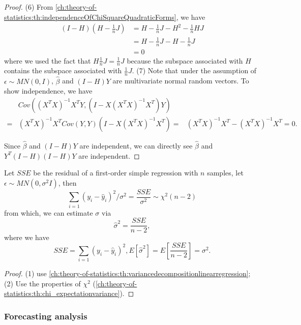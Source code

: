 \begin{refsection}
\begin{proof}
	(6) From \autoref{ch:theory-of-statistics:th:independenceOfChiSquareQuadraticForms}, we have
	\begin{align*}
	(I-H)(H-\frac{1}{n}J) &= H - \frac{1}{n}J - H^2 - \frac{1}{n}HJ \\
	&= H - \frac{1}{n}J - H - \frac{1}{n}J \\
	&= 0
	\end{align*}
	where we used the fact that $H\frac{1}{n}J = \frac{1}{n}J$ because the subspace associated with $H$ contains the subspace associated with $\frac{1}{n}J$. 
	(7) Note that under the assumption of $\epsilon\sim MN(0,I)$, $\hat{\beta}$ and $(I-H)Y$ are multivariate normal random vectors. To show independence, we have
	\begin{align*}
	&Cov((X^TX)^{-1}X^TY,(I-X(X^TX)^{-1}X^T)Y)\\
	=& (X^TX)^{-1}X^T Cov(Y,Y)(I-X(X^TX)^{-1}X^T)
	=& (X^TX)^{-1}X^T - (X^TX)^{-1}X^T = 0.
	\end{align*}
	
	Since $\hat{\beta}$ and $(I-H)Y$ are independent, we can directly see
	$\hat{\beta}$ and $Y^T(I-H)(I-H)Y$ are independent.
\end{proof}

\begin{corollary}\label{ch:statistical-models:th:residualAndEstimationVarianceSimpleRegression}
	Let $SSE$ be the residual of a first-order simple regression with $n$ samples, let $\epsilon \sim MN(0,\sigma^2 I)$,  then
	$$ \sum_{i=1} (y_i - \hat{y}_i)^2/\sigma^2 =  \frac{SSE}{\sigma^2} \sim \chi^2(n-2)$$
	from which, we can estimate $\sigma$ via
	$$\hat{\sigma}^2 = \frac{SSE}{n-2},$$
	where we have 
	$$SSE =  \sum_{i=1} (y_i - \hat{y}_i)^2, E[\hat{\sigma}^2] = E[\frac{SSE}{n-2}] = \sigma^2.$$	
\end{corollary}
\begin{proof}
	(1) use \autoref{ch:theory-of-statistics:th:variancedecompositionlinearregression};
	(2) Use the properties of $\chi^2$ (\autoref{ch:theory-of-statistics:th:chi_expectationvariance}).
\end{proof}



\subsubsection{Forecasting analysis}



\end{refsection}
